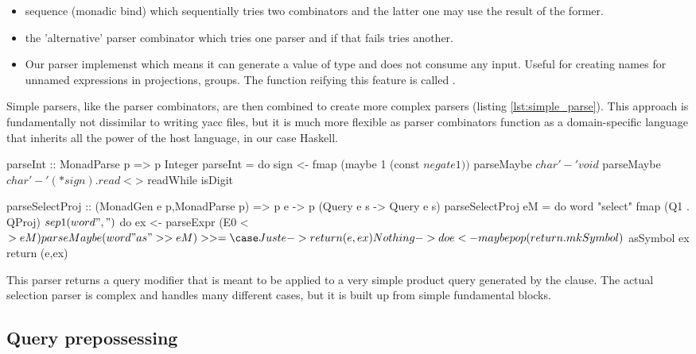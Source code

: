 \begin{itemize}
\item sequence (monadic bind)  which sequentially tries two combinators and the latter one may
  use the result of the former.
\item the 'alternative' parser combinator  which tries one parser and if that fails tries another.
\item Our parser implemenst  which means it can generate a value of type   and does not consume any input. Useful for creating names for unnamed expressions in
  projections, groups. The function reifying this feature is called .
\end{itemize}

Simple parsers, like the  parser combinators, are then
combined to create more complex parsers (listing
\ref{lst:simple_parse}). This approach is fundamentally not dissimilar
to writing yacc files, but it is much more flexible as parser
combinators function as a domain-specific language that inherits all
the power of the host language, in our case Haskell.

\begin{code}
  \begin{haskellcode}
    parseInt :: MonadParse p => p Integer
    parseInt = do
      sign <- fmap (maybe 1 (const $ negate 1)) $ parseMaybe $ char '-'
      void $ parseMaybe $ char '-'
      (* sign) . read <$> readWhile isDigit

    parseSelectProj
      :: (MonadGen e p,MonadParse p)
      => p e -> p (Query e s -> Query e s)
    parseSelectProj eM = do
      word "select"
      fmap (Q1 . QProj) $ sep1 (word ",") $ do
      ex <- parseExpr (E0 <$> eM)
      parseMaybe (word "as" >> eM) >>= \case
        Just e -> return (e,ex)
        Nothing -> do
      e <- maybe pop (return . mkSymbol) $ asSymbol ex
      return (e,ex)
  \end{haskellcode}
  \caption{\label{lst:simple_parse}This parser returns a query
    modifier that is meant to be applied to a very simple product
    query generated by the  clause. The actual selection
    parser is complex and handles many different cases, but it is
    built up from simple fundamental blocks.}
\end{code}

\subsection{Query prepossessing}

